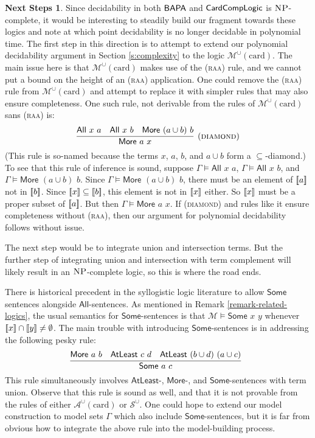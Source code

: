 \documentclass[letterpaper]{article}
\theoremstyle{definition}
\newtheorem*{nextsteps*}{Next Steps}
\newcommand{\semantics}[1]{[\![\mbox{\em $ #1 $\/}]\!]}
\newcommand{\Model}{\mathcal{M}}
\newcommand{\Aunion}{\mathscr{A}^{\cup}}
\newcommand{\Munion}{\mathscr{M}^{\cup}}
\newcommand{\Sunion}{\mathscr{S}^{\cup}}
\newcommand{\BAPA}{\sf{BAPA}}
\newcommand{\CardCompLogic}{\sf{CardCompLogic}}
\newcommand{\proverule}{\textsc}
\newcommand{\raa}{\proverule{raa}}
\newcommand{\NP}{\textsc{NP}}
\newcommand{\All}[2]{\mathsf{All}\,\,#1\,\,#2}
\newcommand{\Some}[2]{\mathsf{Some}\,\,#1\,\,#2}
\newcommand{\Atleast}[2]{\mathsf{AtLeast}\,\,#1\,\,#2}
\newcommand{\More}[2]{\mathsf{More}\,\,#1\,\,#2}
\newcommand{\AllNoArgs}{\mathsf{All}}
\newcommand{\SomeNoArgs}{\mathsf{Some}}
\newcommand{\AtleastNoArgs}{\mathsf{AtLeast}}
\newcommand{\MoreNoArgs}{\mathsf{More}}
\newcommand{\card}{\mathrm{card}}
\begin{document}
\begin{nextsteps*}
Since decidability in both $\BAPA$ and $\CardCompLogic$ is $\NP$-complete, it would be interesting to steadily build our fragment towards these logics and note at which point decidability is no longer decidable in polynomial time.  The first step in this direction is to attempt to extend our polynomial decidability argument in Section \ref{s:complexity} to the logic $\Munion(\card)$.  The main issue here is that $\Munion(\card)$ makes use of the (\raa) rule, and we cannot put a bound on the height of an (\raa) application.  One could remove the (\raa) rule from $\Munion(\card)$ and attempt to replace it with simpler rules that may also ensure completeness.  One such rule, not derivable from the rules of $\Munion(\card)$ sans (\raa) is:
\[
\infer[(\proverule{diamond})]
    {\More{a}{x}}
    {\All{x}{a} & \All{x}{b} & \More{(a \cup b)}{b}}
\]
(This rule is so-named because the terms $x$, $a$, $b$, and $a \cup b$ form a $\subseteq$-diamond.)
To see that this rule of inference is sound, suppose $\Gamma \models \All{x}{a}$, $\Gamma \models \All{x}{b}$, and $\Gamma \models \More{(a \cup b)}{b}$.  Since $\Gamma \models \More{(a \cup b)}{b}$, there must be an element of $\semantics{a}$ not in $\semantics{b}$.  Since $\semantics{x} \subseteq \semantics{b}$, this element is not in $\semantics{x}$ either.  So $\semantics{x}$ must be a proper subset of $\semantics{a}$.  But then $\Gamma \models \More{a}{x}$.  If (\proverule{diamond}) and rules like it ensure completeness without (\raa), then our argument for polynomial decidability follows without issue.

The next step would be to integrate union and intersection terms. But the further step of integrating union and intersection with term complement will likely result in an $\NP$-complete logic, so this is where the road ends.

There is historical precedent in the syllogistic logic
literature to allow $\SomeNoArgs$ sentences alongside
$\AllNoArgs$-sentences.   As mentioned in Remark \ref{remark-related-logics}, the usual semantics for $\SomeNoArgs$-sentences is that $\Model \models \Some{x}{y}$ whenever $\semantics{x} \cap \semantics{y} \ne \emptyset$.
The main trouble with introducing $\SomeNoArgs$-sentences is in addressing the following pesky rule:
\[
\infer[]
    {\Some{a}{c}}
    {\More{a}{b} & \Atleast{c}{d} & \Atleast{(b \cup d)}{(a \cup c)}}
\]
This rule simultaneously involves $\AtleastNoArgs$-, $\MoreNoArgs$-, and $\SomeNoArgs$-sentences with term union.
Observe that this rule is sound as well, and that it is not provable from the rules of either $\Aunion(\card)$ or $\Sunion$.
One could hope to extend our model construction to model sets $\Gamma$ which also include $\SomeNoArgs$-sentences, but it is far from obvious how to integrate the above rule into the model-building process.


\end{nextsteps*}
\end{document}
